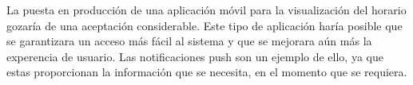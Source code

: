 La puesta en producción de una aplicación móvil para la visualización del horario gozaría de una aceptación considerable. Este tipo de aplicación haría posible que se garantizara un acceso más fácil al sistema  y que se mejorara aún más la experencia de usuario. Las notificaciones push son un ejemplo de ello, ya que estas proporcionan la información que se necesita, en el momento que se requiera. 














